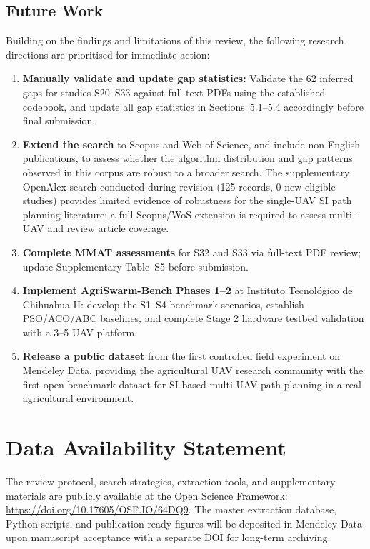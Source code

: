 \documentclass[review,3p,times]{elsarticle}
\begin{document}
\begin{itemize}
{\subsection{Future Work}

Building on the findings and limitations of this review, the following research directions are prioritised for immediate action:

\begin{enumerate}
  \item \textbf{Manually validate and update gap statistics:} Validate the 62 inferred gaps for studies S20--S33 against full-text PDFs using the established codebook, and update all gap statistics in Sections~5.1--5.4 accordingly before final submission.
  \item \textbf{Extend the search} to Scopus and Web of Science, and include non-English publications, to assess whether the algorithm distribution and gap patterns observed in this corpus are robust to a broader search. The supplementary OpenAlex search conducted during revision (125 records, 0 new eligible studies) provides limited evidence of robustness for the single-UAV SI path planning literature; a full Scopus/WoS extension is required to assess multi-UAV and review article coverage.
  \item \textbf{Complete MMAT assessments} for S32 and S33 via full-text PDF review; update Supplementary Table~S5 before submission.
  \item \textbf{Implement AgriSwarm-Bench Phases 1--2} at Instituto Tecnológico de Chihuahua II: develop the S1--S4 benchmark scenarios, establish PSO/ACO/ABC baselines, and complete Stage 2 hardware testbed validation with a 3--5 UAV platform.
  \item \textbf{Release a public dataset} from the first controlled field experiment on Mendeley Data, providing the agricultural UAV research community with the first open benchmark dataset for SI-based multi-UAV path planning in a real agricultural environment.
\end{enumerate}


\section*{Data Availability Statement}
The review protocol, search strategies, extraction tools, and supplementary 
materials are publicly available at the Open Science Framework: 
\url{https://doi.org/10.17605/OSF.IO/64DQ9}. 
The master extraction database, Python scripts, and publication-ready figures 
will be deposited in Mendeley Data upon manuscript acceptance with a separate 
DOI for long-term archiving.

}
\end{itemize}
\end{document}
